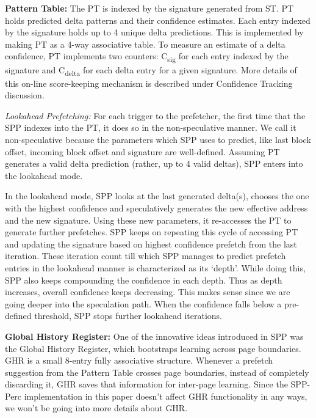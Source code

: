 \textbf{Pattern Table:} The PT is indexed by the signature generated
from ST.  PT holds predicted delta patterns and their confidence
estimates.  Each entry indexed by the signature holds up to 4 unique
delta predictions.  This is implemented by making PT as a 4-way
associative table.  To measure an estimate of a delta confidence, PT
implements two counters: C\textsubscript{sig} for each entry indexed
by the signature and C\textsubscript{delta} for each delta entry for a
given signature.  More details of this on-line score-keeping mechanism
is described under Confidence Tracking discussion.

\textit{Lookahead Prefetching:} For each trigger to the prefetcher,
the first time that the SPP indexes into the PT, it does so in the
non-speculative manner.  We call it non-speculative because the
parameters which SPP uses to predict, like last block offset, incoming
block offset and signature are well-defined.  Assuming PT generates a
valid delta prediction (rather, up to 4 valid deltas), SPP enters into
the lookahead mode.

In the lookahead mode, SPP looks at the last generated delta(s),
chooses the one with the highest confidence and speculatively
generates the new effective address and the new signature.  Using
these new parameters, it re-accesses the PT to generate further
prefetches.  SPP keeps on repeating this cycle of accessing PT and
updating the signature based on highest confidence prefetch from the
last iteration.  These iteration count till which SPP manages to
predict prefetch entries in the lookahead manner is characterized as
its `depth'.  While doing this, SPP also keeps compounding the
confidence in each depth.  Thus as depth increases, overall confidence
keeps decreasing.  This makes sense since we are going deeper into the
speculation path.  When the confidence falls below a pre-defined
threshold, SPP stops further lookahead iterations.

\textbf{Global History Register:} One of the innovative ideas
introduced in SPP was the Global History Register, which bootstraps
learning across page boundaries.  GHR is a small 8-entry fully
associative structure.  Whenever a prefetch suggestion from the
Pattern Table crosses page boundaries, instead of completely
discarding it, GHR saves that information for inter-page learning.
Since the SPP-Perc implementation in this paper doesn't affect GHR
functionality in any ways, we won't be going into more details about
GHR.

